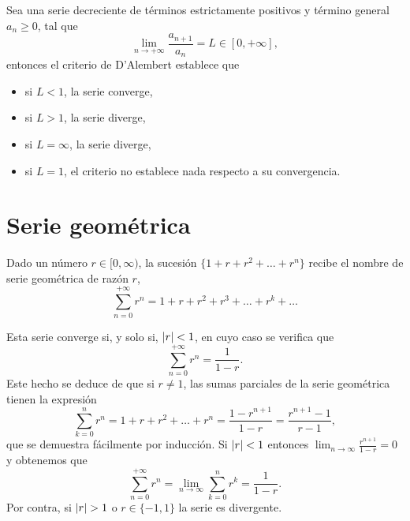 \begin{theorem}
    Sea una serie decreciente de términos estrictamente positivos y término general $a_n\geq 0$, tal que
    \begin{equation}
        \lim_{n\to+\infty}\frac{a_{n + 1}}{a_n} = L\in[0, +\infty],
    \end{equation}
    entonces el criterio de D'Alembert establece que
    \begin{itemize}
        \item si $L < 1$, la serie converge,
        \item si $L > 1$, la serie diverge,
        \item si $L = \infty$, la serie diverge,
        \item si $L = 1$, el criterio no establece nada respecto a su convergencia.
    \end{itemize}
\end{theorem}

\section{Serie geométrica}
\begin{defi}
    Dado un número $r\in[0, \infty)$, la sucesión $\{1 + r + r^2 + \ldots + r^n\} $ recibe el nombre de serie geométrica de razón $r$,
    \begin{equation}
        \sum_{n=0}^{+\infty} r^n = 1 + r + r^2 + r^3 + \ldots + r^k + \ldots
    \end{equation}
\end{defi}

Esta serie converge si, y solo si, $\left\vert r \right\vert < 1$, en cuyo caso se verifica que
\begin{equation}
    \sum_{n=0}^{+\infty}r^n = \frac{1}{1 - r}.
\end{equation}
Este hecho se deduce de que si $r\neq 1$, las sumas parciales de la serie geométrica tienen la expresión
\begin{equation}
    \sum_{k=0}^n r^n = 1 + r + r^2 + \ldots + r^n = \frac{1 - r^{n + 1}}{1 - r} = \frac{r^{n + 1} - 1}{r - 1},
\end{equation}
que se demuestra fácilmente por inducción. Si $\left\vert r \right\vert < 1$ entonces $\lim_{n\to\infty}\frac{r^{n + 1}}{1 - r} = 0$ y obtenemos que
\begin{equation}
    \sum_{n=0}^{+\infty} r^n = \lim_{n\to\infty}\sum_{k=0}^n r^k = \frac{1}{1 - r}.
\end{equation}
Por contra, si $\left\vert r \right\vert > 1$ o $r\in \{-1, 1\} $ la serie es divergente.


